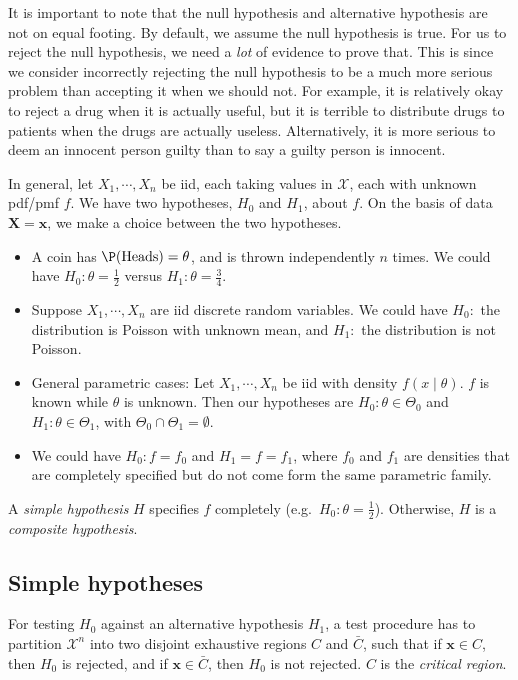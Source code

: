 \documentclass[a4paper]{article}
\begin{document}
It is important to note that the null hypothesis and alternative hypothesis are not on equal footing. By default, we assume the null hypothesis is true. For us to reject the null hypothesis, we need a \emph{lot} of evidence to prove that. This is since we consider incorrectly rejecting the null hypothesis to be a much more serious problem than accepting it when we should not. For example, it is relatively okay to reject a drug when it is actually useful, but it is terrible to distribute drugs to patients when the drugs are actually useless. Alternatively, it is more serious to deem an innocent person guilty than to say a guilty person is innocent.

In general, let $X_1, \cdots, X_n$ be iid, each taking values in $\mathcal{X}$, each with unknown pdf/pmf $f$. We have two hypotheses, $H_0$ and $H_1$, about $f$. On the basis of data $\mathbf{X} = \mathbf{x}$, we make a choice between the two hypotheses.

\begin{eg}\leavevmode
  \begin{itemize}
    \item A coin has $\P(\text{Heads}) = \theta$, and is thrown independently $n$ times. We could have $H_0:\theta = \frac{1}{2}$ versus $H_1: \theta = \frac{3}{4}.$
    \item Suppose $X_1, \cdots, X_n$ are iid discrete random variables. We could have $H_0:$ the distribution is Poisson with unknown mean, and $H_1:$ the distribution is not Poisson.
    \item General parametric cases: Let $X_1, \cdots , X_n$ be iid with density $f(x\mid \theta)$. $f$ is known while $\theta$ is unknown. Then our hypotheses are $H_0: \theta\in \Theta_0$ and $H_1:\theta\in \Theta_1$, with $\Theta_0\cap \Theta_1 = \emptyset$.
    \item We could have $H_0: f = f_0$ and $H_1 = f = f_1$, where $f_0$ and $f_1$ are densities that are completely specified but do not come form the same parametric family.
  \end{itemize}
\end{eg}

\begin{defi}
  A \emph{simple hypothesis} $H$ specifies $f$ completely (e.g.\ $H_0: \theta = \frac{1}{2}$). Otherwise, $H$ is a \emph{composite hypothesis}.
\end{defi}

\subsection{Simple hypotheses}
\begin{defi}
  For testing $H_0$ against an alternative hypothesis $H_1$, a test procedure has to partition $\mathcal{X}^n$ into two disjoint exhaustive regions $C$ and $\bar C$, such that if $\mathbf{x}\in C$, then $H_0$ is rejected, and if $\mathbf{x}\in \bar C$, then $H_0$ is not rejected. $C$ is the \emph{critical region}.
\end{defi}
\end{document}
